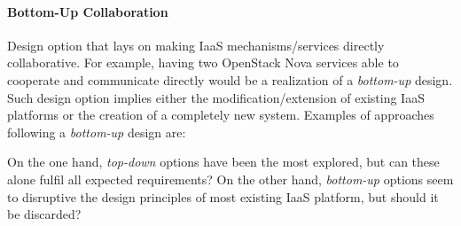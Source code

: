 \paragraph{Bottom-Up Collaboration} Design option that lays on making IaaS mechanisms/services directly collaborative. For example, having two OpenStack Nova services able to cooperate and communicate directly would be a realization of a \emph{bottom-up} design. Such design option implies either the modification/extension of existing IaaS platforms or the creation of a completely new system. Examples of approaches following a \emph{bottom-up} design are:

On the one hand, \emph{top-down} options have been the most explored, but can these alone fulfil all expected requirements? On the other hand, \emph{bottom-up} options seem to disruptive the design principles of most existing IaaS platform, but should it be discarded?
